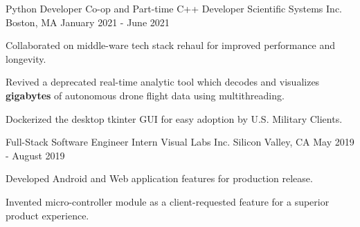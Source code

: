 \begin{cventries}
  \cventry
    {Python Developer Co-op and Part-time C++ Developer} %
    {Scientific Systems Inc.} %
    {Boston, MA} %
    {January 2021 - June 2021} %
    {
      \begin{cvitems} %
        \item {Collaborated on middle-ware tech stack rehaul for improved performance and longevity.}
         \item {Revived a deprecated real-time analytic tool which decodes and visualizes \textbf{gigabytes} of autonomous drone flight data using multithreading.}
        \item {Dockerized the desktop tkinter GUI for easy adoption by U.S. Military Clients.}
      \end{cvitems}
    }
  \cventry
    {Full-Stack Software Engineer Intern} %
    {Visual Labs Inc.} %
    {Silicon Valley, CA} %
    {May 2019 - August 2019} %
    {
      \begin{cvitems} %
        \item {Developed Android and Web application features for production release.}
        \item {Invented micro-controller module as a client-requested feature for a superior product experience.}
      \end{cvitems}
    }

\end{cventries}
